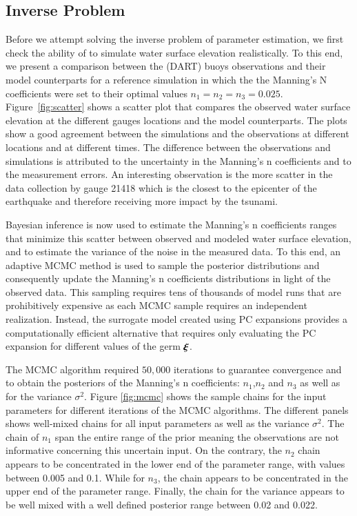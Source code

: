 \subsection{Inverse Problem} 
\label{sec:inverse}

Before we attempt solving the inverse problem of parameter estimation, 
we first check the ability of \geoclaw to simulate water surface elevation
realistically. To this end, we present a comparison between the 
(DART) buoys observations  and their \geoclaw model counterparts
for a reference simulation in which the  the Manning's N coefficients were set to their optimal values $n_1=n_2=n_3=0.025$. Figure~\ref{fig:scatter} 
shows a scatter plot that compares the observed 
water surface elevation at the different gauges locations and the  \geoclaw model counterparts. 
The plots show a good agreement between the simulations and the 
observations at different locations and at different times. 
The difference between the observations and simulations is attributed to the uncertainty in the 
Manning's n coefficients and to the measurement errors.
\alert{An interesting observation is the more scatter in the data collection by gauge 21418 which is the closest to
the epicenter of the earthquake and therefore receiving more impact by the tsunami.}

Bayesian inference is now used to estimate the Manning's 
n coefficients ranges that minimize this scatter between 
observed and modeled water surface elevation, and to estimate the variance of the noise in the measured data.
To this end, an adaptive MCMC method is used to sample 
the posterior distributions \citep{Gareth2009,Haario2001} and consequently 
update the Manning's n coefficients distributions in light of the 
observed data. This sampling requires tens of thousands of 
\geoclaw model runs that are prohibitively expensive as each MCMC 
sample requires an independent \geoclaw realization. Instead,
the surrogate model created using PC expansions provides a computationally
efficient alternative that requires only evaluating the PC expansion
for different values of the germ $\xxi$.

The MCMC algorithm required $50,000$ iterations to guarantee convergence
and to obtain the posteriors of the Manning's n coefficients: 
$n_1$,$n_2$ and $n_3$ as well as for the variance $\sigma^2$. Figure \ref{fig:mcmc} 
shows the sample chains for the input parameters for different iterations of the MCMC algorithms. 
The different panels shows well-mixed chains for all input parameters as well as the variance $\sigma^2$.
The chain of  $n_{1}$ span the entire range of the prior meaning the observations are not informative 
concerning this uncertain input.  On the contrary, the $n_{2}$ chain appears to be concentrated in the 
lower end of the parameter range, with values between 0.005 and 0.1. 
While for $n_{3}$, the chain appears to be concentrated in the 
upper end of the parameter range. Finally, the chain for the variance 
appears to be well mixed with a well defined posterior range between 0.02 and 0.022.


